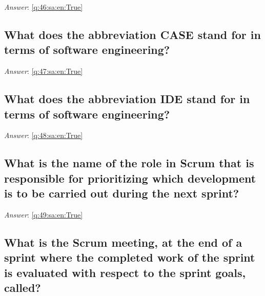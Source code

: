 \documentclass[a4paper,11pt,oneside]{article}
\begin{document}
\begin{sloppypar}
\vspace{1cm}

\textit{Answer}: \autoref{q:46:sa:en:True}



\subsection{What does the abbreviation CASE stand for in terms of software engineering?}

\label{q:47:sa:en:False}

\vspace{2cm}

\noindent\makebox[\textwidth]{\hrulefill}

\vspace{1cm}

\textit{Answer}: \autoref{q:47:sa:en:True}



\subsection{What does the abbreviation IDE stand for in terms of software engineering?}

\label{q:48:sa:en:False}

\vspace{2cm}

\noindent\makebox[\textwidth]{\hrulefill}

\vspace{1cm}

\textit{Answer}: \autoref{q:48:sa:en:True}



\subsection{What is the name of the role in Scrum that is responsible for prioritizing which development is to be carried out during the next sprint?}

\label{q:49:sa:en:False}

\vspace{2cm}

\noindent\makebox[\textwidth]{\hrulefill}

\vspace{1cm}

\textit{Answer}: \autoref{q:49:sa:en:True}



\subsection{What is the Scrum meeting, at the end of a sprint where the completed work of the sprint is evaluated with respect to the sprint goals, called?}


\end{sloppypar}
\end{document}
